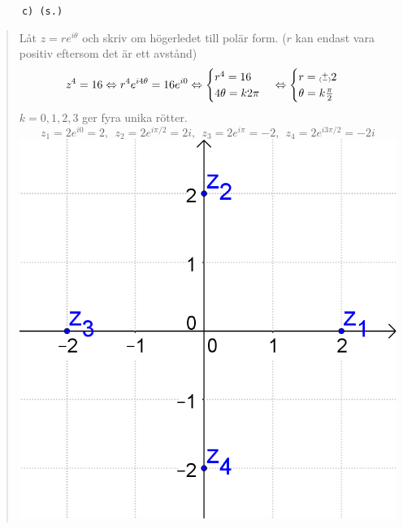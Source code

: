 \documentclass[a4paper]{article}
\newcommand{\tskcol}[1]{\textcolor{tskcol}{#1}}
\newcommand\varpm{\mathbin{\vcenter{\hbox{%
				\oalign{\hfil$\scriptstyle+$\hfil\cr
					\noalign{\kern-.5ex}					
					$\scriptscriptstyle({-})$\cr}%
			}}}}
\begin{document}
	\pagebreak
	\texttt{\tskcol{~~~~~~c) (s.)}}
	\begin{quotation}
		\noindent
		Låt $z=re^{i\theta}$ och skriv om högerledet till polär form. ($r$ kan endast vara positiv eftersom det är ett avstånd)
		\[z^4=16 \Leftrightarrow
		r^4e^{i4\theta}=16e^{i0} \Leftrightarrow
		\begin{cases}
		r^4 = 16 \\
		4\theta=k2\pi
		\end{cases} \Leftrightarrow
		\begin{cases}
		r=\varpm 2 \\
		\theta=k\frac{\pi}{2}
		\end{cases}\] 
		$k=0,1,2,3$ ger fyra unika rötter.
		\[z_1=2e^{i0}=2,~~
		z_2=2e^{i\pi/2}=2i,~~
		z_3=2e^{i\pi}=-2,~~
		z_4=2e^{i3\pi/2}=-2i\]
		\includegraphics[scale=0.2]{images/641c.PNG}
	\end{quotation}
	
\end{document}
